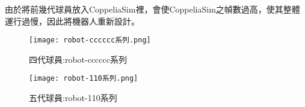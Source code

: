 \begin{flushleft}
\fontsize{14pt}{20pt}\sectionef\hspace{12pt}\quad 由於將前幾代球員放入CoppeliaSim裡，會使CoppeliaSim之幀數過高，使其整體運行過慢，因此將機器人重新設計。
\end{flushleft}

\begin{figure}[h]
\texttt{[image: robot-cccccc系列.png]}
\caption{四代球員:robot-cccccc系列}
\end{figure}

\begin{figure}[h]
\texttt{[image: robot-110系列.png]}
\caption{五代球員:robot-110系列}
\end{figure}